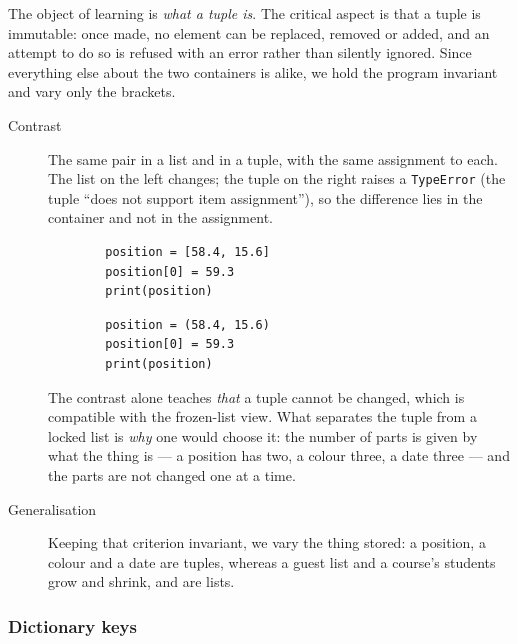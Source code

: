 The object of learning is \emph{what a tuple is}. The critical aspect is that
a tuple is immutable: once made, no element can be replaced, removed or added,
and an attempt to do so is refused with an error rather than silently ignored.
Since everything else about the two containers is alike, we hold the program
invariant and vary only the brackets.

\begin{description}
  \item[Contrast] The same pair in a list and in a tuple, with the same
    assignment to each. The list on the left changes; the tuple on the right
    raises a \texttt{TypeError} (the tuple \enquote{does not
    support item assignment}), so the difference lies in the container and
    not in the assignment.

    \hfill
    \begin{minipage}[t]{0.45\columnwidth}
      \begin{verbatim}
        position = [58.4, 15.6]
        position[0] = 59.3
        print(position)
      \end{verbatim}
    \end{minipage}
    \hfill
    \begin{minipage}[t]{0.45\columnwidth}
      \begin{verbatim}
        position = (58.4, 15.6)
        position[0] = 59.3
        print(position)
      \end{verbatim}
    \end{minipage}
    \newline
    The contrast alone teaches \emph{that} a tuple cannot be changed, which is
    compatible with the frozen-list view. What separates the tuple from a
    locked list is \emph{why} one would choose it: the number of parts is given
    by what the thing is --- a position has two, a colour three, a date three
    --- and the parts are not changed one at a time.

  \item[Generalisation] Keeping that criterion invariant, we vary the thing
    stored: a position, a colour and a date are tuples, whereas a guest list
    and a course's students grow and shrink, and are lists.
\end{description}

\subsubsection{Dictionary keys}


